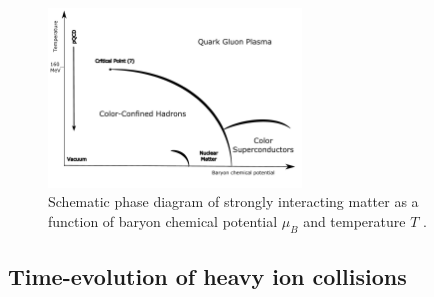 \begin{figure}[hbtp]
\begin{center}
\includegraphics[width=0.6\textwidth]{illustrations/qcd_phase_diagram.pdf}
\caption[QCD phase diagram]{Schematic phase diagram of strongly interacting matter as a function of baryon chemical potential $\mu_{B}$ and temperature $T$ .}
\label{fig:illustration_qcd_phase_diagram}
\end{center}
\end{figure}

\subsection{Time-evolution of heavy ion collisions}

